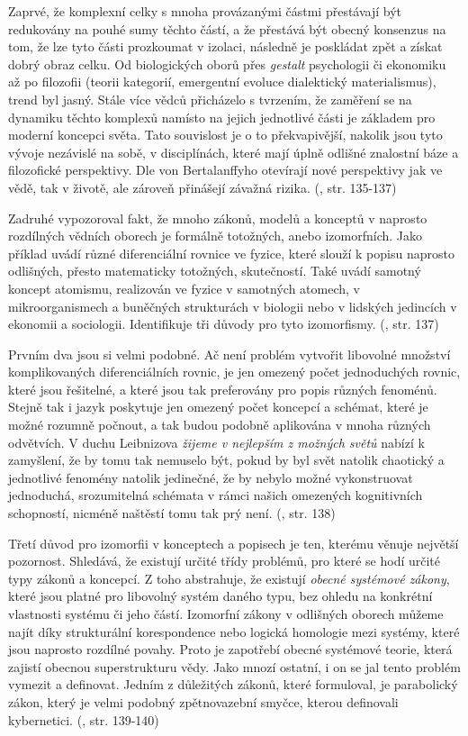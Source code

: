 \documentclass[11pt,a4paper]{article}
\begin{document}
Zaprvé, že komplexní celky s mnoha provázanými částmi přestávají být redukovány na pouhé sumy těchto částí, a že přestává být obecný konsenzus na tom, že lze tyto části prozkoumat v izolaci, následně je poskládat zpět a získat dobrý obraz celku. Od biologických oborů přes \textit{gestalt} psychologii či ekonomiku až po filozofii (teorii kategorií, emergentní evoluce dialektický materialismus), trend byl jasný. Stále více vědců přicházelo s tvrzením, že zaměření se na dynamiku těchto komplexů namísto na jejich jednotlivé části je základem pro moderní koncepci světa. Tato souvislost je o to překvapivější, nakolik jsou tyto vývoje nezávislé na sobě, v disciplínách, které mají úplně odlišné znalostní báze a filozofické perspektivy. Dle von Bertalanffyho otevírají nové perspektivy jak ve vědě, tak v životě, ale zároveň přinášejí závažná rizika. (\cite{von_bertalanffy_outline_1950}, str. 135-137)

Zadruhé vypozoroval fakt, že mnoho zákonů, modelů a konceptů v naprosto rozdílných vědních oborech je formálně totožných, anebo izomorfních. Jako příklad uvádí různé diferenciální rovnice ve fyzice, které slouží k popisu naprosto odlišných, přesto matematicky totožných, skutečností. Také uvádí samotný koncept atomismu, realizován ve fyzice v samotných atomech, v mikroorganismech a buněčných strukturách v biologii nebo v lidských jedincích v ekonomii a sociologii. Identifikuje tři důvody pro tyto izomorfismy. (\cite{von_bertalanffy_outline_1950}, str. 137)

Prvním dva jsou si velmi podobné. Ač není problém vytvořit libovolné množství komplikovaných diferenciálních rovnic, je jen omezený počet jednoduchých rovnic, které jsou řešitelné, a které jsou tak preferovány pro popis různých fenoménů. Stejně tak i jazyk poskytuje jen omezený počet koncepcí a schémat, které je možné rozumně počnout, a tak budou podobně aplikována v mnoha různých odvětvích. V duchu Leibnizova \textit{žijeme v nejlepším z možných světů} nabízí k zamyšlení, že by tomu tak nemuselo být, pokud by byl svět natolik chaotický a jednotlivé fenomény natolik jedinečné, že by nebylo možné vykonstruovat jednoduchá, srozumitelná schémata v rámci našich omezených kognitivních schopností, nicméně naštěstí tomu tak prý není. (\cite{von_bertalanffy_outline_1950}, str. 138)

Třetí důvod pro izomorfii v konceptech a popisech je ten, kterému věnuje největší pozornost. Shledává, že existují určité třídy problémů, pro které se hodí určité typy zákonů a koncepcí. Z toho abstrahuje, že existují \textit{obecné systémové zákony}, které jsou platné pro libovolný systém daného typu, bez ohledu na konkrétní vlastnosti systému či jeho částí. Izomorfní zákony v odlišných oborech můžeme najít díky strukturální korespondence nebo logická homologie mezi systémy, které jsou naprosto rozdílné povahy. Proto je zapotřebí obecné systémové teorie, která zajistí obecnou superstrukturu vědy. Jako mnozí ostatní, i on se jal tento problém vymezit a definovat. Jedním z důležitých zákonů, které formuloval, je parabolický zákon, který je velmi podobný zpětnovazební smyčce, kterou definovali kybernetici. (\cite{von_bertalanffy_outline_1950}, str. 139-140)
\end{document}
